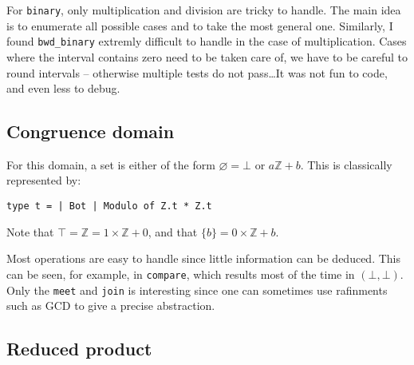 \documentclass[12pt,a4paper]{article}
\begin{document}
For \texttt{binary}, only multiplication and division are tricky to handle. The main idea is to enumerate all possible cases and to take the most general one. Similarly, I found \texttt{bwd\_binary} extremly difficult to handle in the case of multiplication. Cases where the interval contains zero need to be taken care of, we have to be careful to round intervals -- otherwise multiple tests do not pass\dots It was not fun to code, and even less to debug.

\subsection{Congruence domain}
For this domain, a set is either of the form $\varnothing=\bot$ or $a\mathbb{Z}+b$. This is classically represented by:
\begin{center}
    \texttt{type t = | Bot | Modulo of Z.t * Z.t}
\end{center}
Note that $\top=\mathbb{Z}=1\times\mathbb{Z}+0$, and that $\{b\}=0\times\mathbb{Z}+b$.

Most operations are easy to handle since little information can be deduced. This can be seen, for example, in \texttt{compare}, which results most of the time in $(\bot, \bot)$. Only the \texttt{meet} and \texttt{join} is interesting since one can sometimes use rafinments such as GCD to give a precise abstraction.

\subsection{Reduced product}
\end{document}
